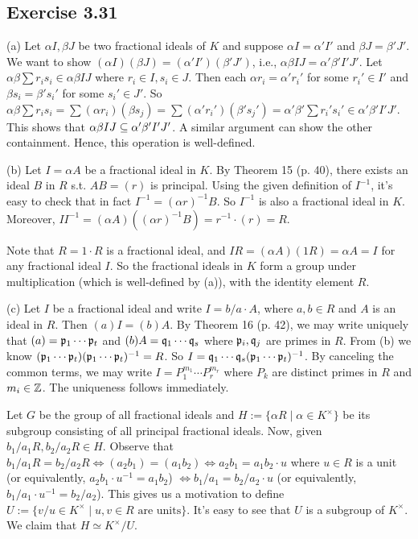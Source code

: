 \documentclass[../Marcus.tex]{subfiles}
\begin{document}
\subsection*{Exercise 3.31}

(a) Let $\alpha I,\beta J$ be two fractional ideals of $K$ and suppose $\alpha I=\alpha'I'$ and $\beta J=\beta'J'$. We want to show $(\alpha I)(\beta J)=(\alpha'I')(\beta'J')$, i.e., $\alpha\beta IJ=\alpha'\beta'I'J'$. Let $\alpha\beta\sum r_is_i\in\alpha\beta IJ$ where $r_i\in I,s_i\in J$. Then each $\alpha r_i=\alpha'r_i'$ for some $r_i'\in I'$ and $\beta s_i=\beta's_i'$ for some $s_i'\in J'$. So $\alpha\beta \sum r_is_i=\sum (\alpha r_i)(\beta s_j) = \sum (\alpha'r_i')(\beta's_j') = \alpha'\beta' \sum r_i's_i' \in \alpha'\beta' I'J'$. This shows that $\alpha\beta IJ\subseteq \alpha'\beta'I'J'$. A similar argument can show the other containment. Hence, this operation is well-defined.

(b) Let $I=\alpha A$ be a fractional ideal in $K$. By Theorem 15 (p. 40), there exists an ideal $B$ in $R$ s.t. $AB=(r)$ is principal. Using the given definition of $I^{-1}$, it's easy to check that in fact $I^{-1}=(\alpha r)^{-1}B$. So $I^{-1}$ is also a fractional ideal in $K$. Moreover, $II^{-1}=(\alpha A)((\alpha r)^{-1}B)=r^{-1}\cdot(r)=R$.

Note that $R=1\cdot R$ is a fractional ideal, and $IR=(\alpha A)(1R)=\alpha A=I$ for any fractional ideal $I$. So the fractional ideals in $K$ form a group under multiplication (which is well-defined by (a)), with the identity element $R$.

(c) Let $I$ be a fractional ideal and write $I=b/a\cdot A$, where $a,b\in R$ and $A$ is an ideal in $R$. Then $(a)I=(b)A$. By Theorem 16 (p. 42), we may write uniquely that $(a)=\mathfrak{p}_1\cdots\mathfrak{p}_t$ and $(b)A=\mathfrak{q}_1\cdots\mathfrak{q}_s$ where $\mathfrak{p}_i,\mathfrak{q}_j$ are primes in $R$. From (b) we know $(\mathfrak{p}_1\cdots\mathfrak{p}_t)(\mathfrak{p}_1\cdots\mathfrak{p}_t)^{-1}=R$. So $I=\mathfrak{q}_1\cdots\mathfrak{q}_s(\mathfrak{p}_1\cdots\mathfrak{p}_t)^{-1}$. By canceling the common terms, we may write $I=P_1^{m_1}\cdots P_r^{m_r}$ where $P_k$ are distinct primes in $R$ and $m_i\in\mathbb{Z}$. The uniqueness follows immediately.

Let $G$ be the group of all fractional ideals and $H:=\{\alpha R\mid \alpha\in K^\times\}$ be its subgroup consisting of all principal fractional ideals. Now, given $b_1/a_1R, b_2/a_2R\in H$. Observe that $b_1/a_1R=b_2/a_2R \iff (a_2b_1)=(a_1b_2) \iff a_2b_1=a_1b_2\cdot u$ where $u\in R$ is a unit (or equivalently, $a_2b_1\cdot u^{-1}=a_1b_2$) $\iff b_1/a_1=b_2/a_2\cdot u$ (or equivalently, $b_1/a_1\cdot u^{-1}=b_2/a_2$). This gives us a motivation to define $U:=\{v/u\in K^\times\mid u,v\in R\text{ are units}\}$. It's easy to see that $U$ is a subgroup of $K^\times$. We claim that $H\simeq K^\times/U$.
\end{document}
